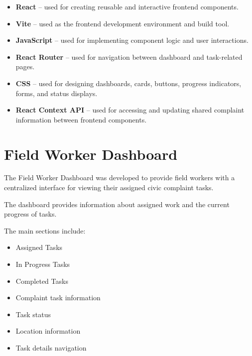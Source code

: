\documentclass[12pt,a4paper]{article}
\begin{document}
\begin{itemize}
    \item \textbf{React} -- used for creating reusable and interactive
    frontend components.
    
    \item \textbf{Vite} -- used as the frontend development environment and
    build tool.
    
    \item \textbf{JavaScript} -- used for implementing component logic and
    user interactions.
    
    \item \textbf{React Router} -- used for navigation between dashboard and
    task-related pages.
    
    \item \textbf{CSS} -- used for designing dashboards, cards, buttons,
    progress indicators, forms, and status displays.
    
    \item \textbf{React Context API} -- used for accessing and updating
    shared complaint information between frontend components.
\end{itemize}

\section{Field Worker Dashboard}

The Field Worker Dashboard was developed to provide field workers with a
centralized interface for viewing their assigned civic complaint tasks.

The dashboard provides information about assigned work and the current
progress of tasks.

The main sections include:

\begin{itemize}
    \item Assigned Tasks
    \item In Progress Tasks
    \item Completed Tasks
    \item Complaint task information
    \item Task status
    \item Location information
    \item Task details navigation
\end{itemize}
\end{document}
